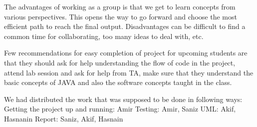 \documentclass[12pt, dvipsnames, a4paper]{article}
\begin{document}
The advantages of working as a group is that we get to learn concepts from various perspectives. This opens the way to go forward and choose the most efficient path to reach the final output. Disadvantages can be difficult to find a common time for collaborating, too many ideas to deal with, etc.

Few recommendations for easy completion of project for upcoming students are that they should ask for help understanding the flow of code in the project, attend lab session and ask for help from TA, make sure that they understand the basic concepts of JAVA and also the software concepts taught in the class.

We had distributed the work that was supposed to be done in following ways: 
Getting the project up and running: Amir
Testing: Amir, Saniz
UML: Akif, Hasnanin
Report: Saniz, Akif, Hasnain
\end{document}
